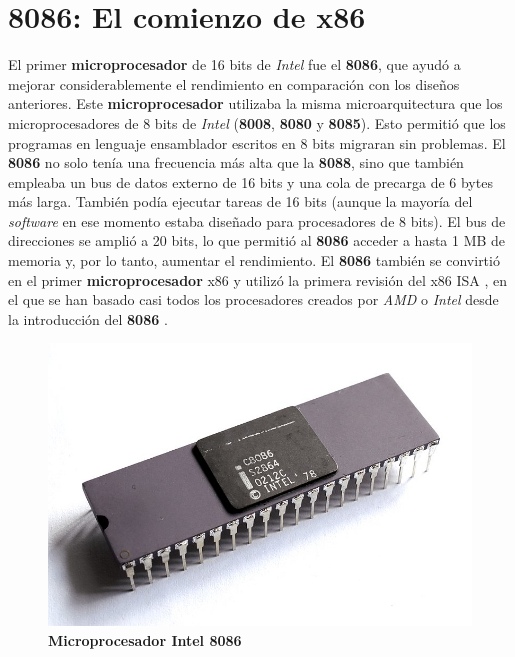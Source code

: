 \section{8086: El comienzo de x86}
El primer \textbf{microprocesador} de 16 bits de \emph{Intel} fue el \textbf{8086}, que ayudó a mejorar considerablemente el rendimiento en comparación
con los diseños anteriores. Este \textbf{microprocesador} utilizaba la misma microarquitectura que los microprocesadores de 8 bits de \emph{Intel}
(\textbf{8008}, \textbf{8080} y \textbf{8085}). Esto permitió que los programas en lenguaje ensamblador escritos en 8 bits migraran sin
problemas. El \textbf{8086} no solo tenía una frecuencia más alta que la \textbf{8088}, sino que también empleaba un bus de datos externo
de 16 bits y una cola de precarga de 6 bytes más larga. También podía ejecutar tareas de 16 bits (aunque la mayoría del \emph{software} en
ese momento estaba diseñado para procesadores de 8 bits). El bus de direcciones se amplió a 20 bits, lo que permitió al \textbf{8086} acceder
a hasta 1 MB de memoria y, por lo tanto, aumentar el rendimiento. El \textbf{8086} también se convirtió en el primer \textbf{microprocesador} x86 y utilizó
la primera revisión del x86 ISA , en el que se han basado casi todos los procesadores creados por \emph{AMD}
o \emph{Intel} desde la introducción del \textbf{8086} .

\begin{figure}[htb]
	\centering
	\includegraphics[scale = 0.2]{Graphics/Intel_C8086.jpg}
	\caption{\textbf{Microprocesador Intel 8086}}
	\label{fig:16}
\end{figure}

